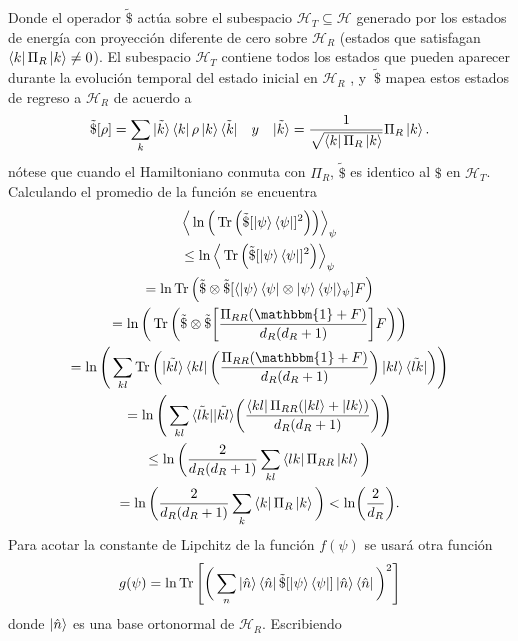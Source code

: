 \begin{enumerate}
Donde el operador  $ \tilde{\$} $ actúa sobre el subespacio $\mathcal{H}_{T} \subseteq \mathcal{H}$ generado por los estados de energía con proyección diferente de cero sobre $\mathcal{H}_{R}$ (estados que satisfagan $\bra{k} \Pi_{R} \ket{k} \neq 0$). El subespacio $\mathcal{H}_{T}$ contiene todos los estados que pueden aparecer durante la evolución temporal del estado inicial en $\mathcal{H}_{R}$ , y $\ \widetilde{\$} $ mapea estos estados de regreso a $\mathcal{H}_{R}$ de acuerdo a 
\begin{equation}
 \tilde{\$}[\rho]= \sum_{k}  \tilde{\ket{k}} \bra{k} \rho \ket{k} \tilde{\bra{k}} \quad y \quad  \tilde{\ket{k}}= \frac{1}{\sqrt{\bra{k}\Pi_{R}\ket{k}}} \Pi_{R} \ket{k}.
\end{equation}
nótese que cuando el Hamiltoniano conmuta con $\Pi_{R}$, $ \tilde{\$}$ es identico al $ \$ $ en $\mathcal{H}_{T}$. Calculando el promedio de la función se encuentra
\begin{multline}
\Big \langle \ln \Big( \Tr \Big( \tilde{\$}[ \ket{\psi}\bra{\psi}]^{2} \Big) \Big) \Big \rangle_{\psi}\\
\leq \ln \Big \langle \Tr \Big( \tilde{\$}[\ket{\psi}\bra{\psi}]^{2} \Big) \Big \rangle_{\psi}\\
= \ln \Tr\Big( \tilde{\$}\otimes \tilde{\$} [\langle \ket{\psi}\bra{\psi} \otimes \ket{\psi}\bra{\psi} \rangle_{\psi}] F \Big)\\
= \ln \bigg( \Tr \bigg( \tilde{\$}\otimes \tilde{\$} \bigg[ \frac{\Pi_{RR}(\mathbbm{1}+F)}{d_{R}(d_{R}+1)} \bigg] F   \bigg) \bigg)\\
= \ln \Bigg( \sum_{kl} \Tr \bigg( \tilde{\ket{kl}} \bra{kl} \bigg( \frac{\Pi_{RR}(\mathbbm{1}+F)}{d_{R}(d_{R}+1)} \bigg) \ket{kl}  \tilde{\bra{lk}}  \bigg) \Bigg)\\
= \ln \Bigg( \sum_{kl} \tilde{\bra{lk}}\tilde{\ket{kl}} \bigg( \frac{\bra{kl}\Pi_{RR}(\ket{kl}+\ket{lk})}{d_{R}(d_{R}+1)} \bigg) \Bigg)\\
\leq \ln \bigg( \frac{2}{d_{R}(d_{R}+1)} \sum_{kl} \bra{lk}\Pi_{RR}\ket{kl}  \bigg)\\
= \ln \bigg(  \frac{2}{d_{R}(d_{R}+1)} \sum_{k} \bra{k}\Pi_{R} \ket{k}  \bigg) < \ln (\frac{2}{d_{R}}).
\end{multline}
Para acotar la constante de Lipchitz  de la función $f(\psi)$ se usará otra función
\begin{equation}
g(\psi)= \ln \Tr \Bigg[  \bigg( \sum_{n} \ket{\hat{n}}\bra{\hat{n}} \tilde{\$} [\ket{\psi}\bra{\psi}] \ket{\hat{n}}\bra{\hat{n}} \bigg)^{2}  \Bigg]
\end{equation}
donde $\ket{\hat{n}}$ es una base ortonormal de $\mathcal{H}_{R}$. Escribiendo


\end{enumerate}
